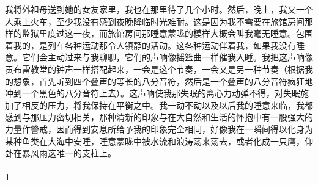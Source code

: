 \par 我将外祖母送到她的女友家里，我也在那里待了几个小时。然后，晚上，我又一个人乘上火车，至少我没有感到夜晚降临时光难耐。这是因为我不需要在旅馆房间那样的监狱里度过这一夜，而旅馆房间那睡意蒙眬的模样大概会叫我毫无睡意。包围着我的，是列车各种运动那令人镇静的活动。这各种运动伴着我，如果我没有睡意。它们会主动过来与我聊聊，它们的声响像摇篮曲一样催我入睡。我把这声响像贡布雷教堂的钟声一样搭配起来，一会是这个节奏，一会又是另一种节奏（根据我的想象，首先听到四个叠声的等长的八分音符，然后是一个叠声的八分音符疯狂地冲到一个黑色的八分音符上去）。这声响使我那失眠的离心力动弹不得，对失眠施加了相反的压力，将我保持在平衡之中。我一动不动以及以后我的睡意来临，我都感到与那压力密切相关，那种清新的印象与在大自然和生活的怀抱中有一股强大的力量作警戒，因而得到安息所给予我的印象完全相同，好像我在一瞬间得以化身为某种鱼类在大海中安睡，睡意蒙眬中被水流和浪涛荡来荡去，或者化成一只鹰，仰卧在暴风雨这唯一的支柱上。




\paragraph*{1}

